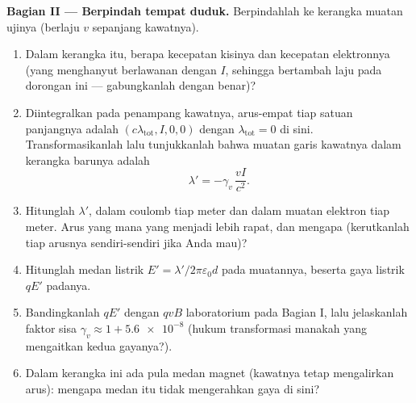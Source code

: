 \begin{problem}
\medskip\noindent\textbf{Bagian II --- Berpindah tempat duduk.}
Berpindahlah ke kerangka muatan ujinya (berlaju $v$ sepanjang kawatnya).
\begin{enumerate}[resume]
  \item Dalam kerangka itu, berapa kecepatan kisinya dan kecepatan
        elektronnya (yang menghanyut berlawanan dengan $I$, sehingga
        bertambah laju pada dorongan ini --- gabungkanlah dengan benar)?
  \item Diintegralkan pada penampang kawatnya, arus-empat tiap satuan
        panjangnya adalah $(c\lambda_{\text{tot}}, I, 0, 0)$ dengan
        $\lambda_{\text{tot}} = 0$ di sini. Transformasikanlah lalu
        tunjukkanlah bahwa muatan garis kawatnya dalam kerangka barunya
        adalah
        \[
        \lambda' = -\gamma_v\,\frac{vI}{c^2} .
        \]
  \item Hitunglah $\lambda'$, dalam coulomb tiap meter dan dalam muatan
        elektron tiap meter. Arus yang mana yang menjadi lebih rapat, dan
        mengapa (kerutkanlah tiap arusnya sendiri-sendiri jika Anda mau)?
  \item Hitunglah medan listrik $E' = \lambda'/2\pi\varepsilon_0d$
        pada muatannya, beserta gaya listrik $qE'$ padanya.
  \item Bandingkanlah $qE'$ dengan $qvB$ laboratorium pada Bagian I,
        lalu jelaskanlah faktor sisa $\gamma_v \approx 1 + \num{5.6e-8}$
        (hukum transformasi  manakah yang mengaitkan kedua
        gayanya?).
  \item Dalam kerangka ini ada pula medan magnet (kawatnya tetap
        mengalirkan arus): mengapa medan itu tidak mengerahkan gaya di
        sini?
\end{enumerate}


\end{problem}

